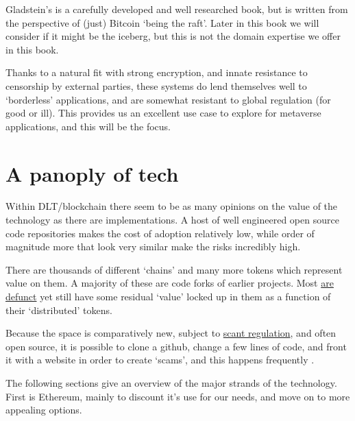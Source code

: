 
Gladstein's is a carefully developed and well researched book, but is written from the perspective of (just) Bitcoin `being the raft'. Later in this book we will consider if it might be the iceberg, but this is not the domain expertise we offer in this book.\par
Thanks to a natural fit with strong encryption, and innate resistance to censorship by external parties, these systems do lend themselves well to `borderless' applications, and are somewhat resistant to global regulation (for good or ill). This provides us an excellent use case to explore for metaverse applications, and this will be the focus.
\section{A panoply of tech}
Within DLT/blockchain there seem to be as many opinions on the value of the technology as there are implementations. A host of well engineered open source code repositories makes the cost of adoption relatively low, while order of magnitude more that look very similar make the risks incredibly high.\par
There are thousands of different `chains' and many more tokens which represent value on them. A majority of these are code forks of earlier projects. Most \href{https://99bitcoins.com/deadcoins/}{are defunct} yet still have some residual `value' locked up in them as a function of their `distributed' tokens. \par 
Because the space is comparatively new, subject to \href{https://www.esma.europa.eu/press-news/consultations/call-evidence-dlt-pilot-regime}{scant regulation}, and often open source, it is possible to clone a github, change a few lines of code, and front it with a website in order to create `scams', and this happens frequently \cite{golumbia2020cryptocurrency}.\par
The following sections give an overview of the major strands of the technology. First is Ethereum, mainly to discount it's use for our needs, and move on to more appealing options.
